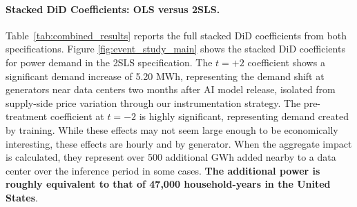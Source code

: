\documentclass[a4paper,fleqn,longmktitle]{cas-sc}
\newcommand{\nb}[1]{\textcolor{blue}{NB[#1]}}
\begin{document}
\paragraph{Stacked DiD Coefficients: OLS versus 2SLS.} Table~\ref{tab:combined_results} reports the full stacked DiD coefficients from both specifications. Figure \ref{fig:event_study_main} shows the stacked DiD coefficients for power demand in the 2SLS specification. The $t=+2$ coefficient shows a significant demand increase of 5.20 MWh, representing the demand shift at generators near data centers two months after AI model release, isolated from supply-side price variation through our instrumentation strategy. The pre-treatment coefficient at $t=-2$ is highly significant, representing demand created by training. While these effects may not seem large enough to be economically interesting, these effects are hourly and by generator. When the aggregate impact is calculated, they represent over 500 additional GWh added nearby to a data center over the inference period in some cases. \textbf{The additional power is roughly equivalent to that of 47,000 household-years in the United States}.

\end{document}
